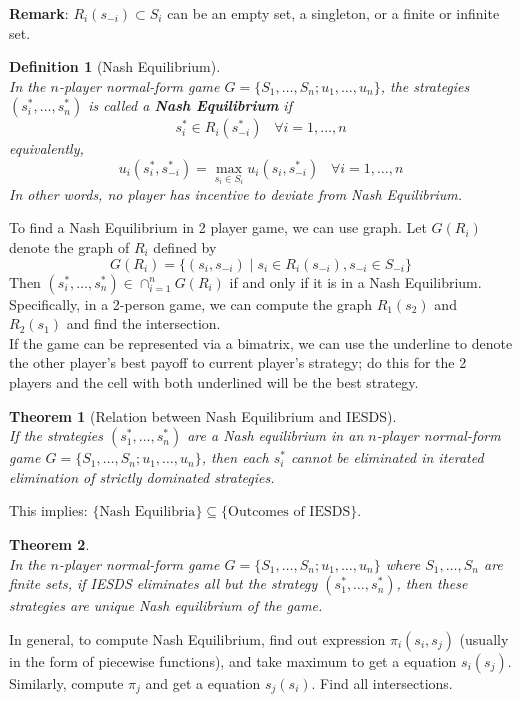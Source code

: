 \documentclass[12pt]{article}
\newtheorem{definition}{Definition}[section]
\newtheorem{theorem}{Theorem}[section]
\theoremstyle{definition}
\begin{document}
\textbf{Remark}: $R_i(s_{-i})\subset S_i$ can be an empty set, a singleton, or a finite or infinite set.
\begin{definition}[Nash Equilibrium]
\hfill\\\normalfont In the $n$-player normal-form game $G=\{S_1,\ldots, S_n; u_1,\ldots, u_n\}$, the strategies $(s_i^\ast, \ldots, s_n^\ast)$ is called a \textbf{Nash Equilibrium} if
\[
s_i^\ast \in R_i(s_{-i}^\ast) \;\;\;\forall i=1,\ldots, n
\]
equivalently, 
\[
u_i(s_i^\ast, s_{-i}^\ast) = \max_{s_i\in S_i} u_i(s_i, s_{-i}^\ast)\;\;\;\forall i=1,\ldots, n
\]
In other words, no player has incentive to deviate from Nash Equilibrium.
\end{definition}
To find a Nash Equilibrium in 2 player game, we can use graph. Let $G(R_i)$ denote the graph of $R_i$ defined by
\[
G(R_i)=\{(s_i, s_{-i})\mid s_i\in R_i(s_{-i}), s_{-i}\in S_{-i}\}
\]
Then $(s_i^\ast, \ldots, s_n^\ast)\in \cap_{i=1}^n G(R_i)$ if and only if it is in a Nash Equilibrium.\\
Specifically, in a 2-person game, we can compute the graph $R_1(s_2)$ and $R_2(s_1)$ and find the intersection.\\
If the game can be represented via a bimatrix, we can use the underline to denote the other player's best payoff to current player's strategy; do this for the 2 players and the cell with both underlined will be the best strategy.
\begin{theorem}[Relation between Nash Equilibrium and IESDS]
\hfill\\\normalfont If the strategies $(s_1^\ast, \ldots, s_n^\ast)$ are a Nash equilibrium in an $n$-player normal-form game $G=\{S_1,\ldots, S_n; u_1,\ldots, u_n\}$, then each $s_i^\ast$ cannot be eliminated in iterated elimination of strictly dominated strategies.
\end{theorem}
This implies: $\{\text{Nash Equilibria}\}\subseteq \{\text{Outcomes of IESDS}\}$.
\begin{theorem}
\hfill\\\normalfont In the $n$-player normal-form game $G=\{S_1,\ldots, S_n; u_1,\ldots, u_n\}$ where $S_1,\ldots, S_n$ are \textit{finite} sets, if IESDS eliminates all but the strategy $(s_1^\ast, \ldots, s_n^\ast)$, then these strategies are unique Nash equilibrium of the game.
\end{theorem}
In general, to compute Nash Equilibrium, find out expression $\pi_i(s_i, s_j)$ (usually in the form of piecewise functions), and take maximum to get a equation $s_i(s_j)$. Similarly, compute $\pi_j$ and get a equation $s_j(s_i)$. Find all intersections.
\end{document}
